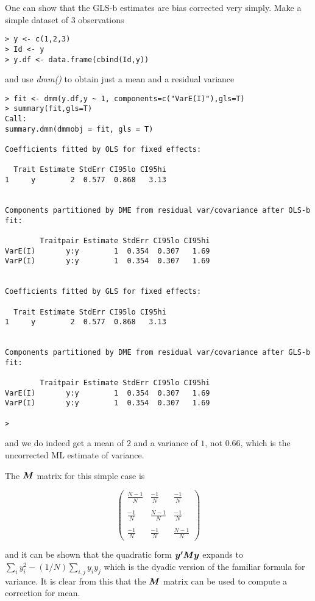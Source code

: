 \documentclass[titlepage]{article}  %
\begin{document}
One can show that the GLS-b estimates are bias corrected very simply. Make a simple dataset of 3 observations

\begin{verbatim}
> y <- c(1,2,3)
> Id <- y
> y.df <- data.frame(cbind(Id,y))
\end{verbatim}

and use {\em dmm()} to obtain just a mean and a residual variance

\begin{verbatim}
> fit <- dmm(y.df,y ~ 1, components=c("VarE(I)"),gls=T)
> summary(fit,gls=T)
Call:
summary.dmm(dmmobj = fit, gls = T)

Coefficients fitted by OLS for fixed effects:

  Trait Estimate StdErr CI95lo CI95hi
1     y        2  0.577  0.868   3.13


Components partitioned by DME from residual var/covariance after OLS-b fit:

        Traitpair Estimate StdErr CI95lo CI95hi
VarE(I)       y:y        1  0.354  0.307   1.69
VarP(I)       y:y        1  0.354  0.307   1.69


Coefficients fitted by GLS for fixed effects:

  Trait Estimate StdErr CI95lo CI95hi
1     y        2  0.577  0.868   3.13


Components partitioned by DME from residual var/covariance after GLS-b fit:

        Traitpair Estimate StdErr CI95lo CI95hi
VarE(I)       y:y        1  0.354  0.307   1.69
VarP(I)       y:y        1  0.354  0.307   1.69

> 
\end{verbatim}
 
and we do indeed get a mean of $2$ and a variance of $1$, not $0.66$, which is the uncorrected ML estimate of variance.

The $\mbox{\boldmath $M$}$ matrix for this simple case is 

\[ \left( \begin{array}{ccc}
 \frac{N-1}{N} & \frac{-1}{N}  & \frac{-1}{N} \\ \\
 \frac{-1}{N}  & \frac{N-1}{N} & \frac{-1}{N} \\ \\
 \frac{-1}{N}  & \frac{-1}{N}  & \frac{N-1}{N}
\end{array} \right) \]

and it can be shown that the quadratic form $\mbox{\boldmath $y^{\prime}My$}$ expands to $\sum_{i}y_{i}^{2} - (1/N)\sum_{i,j}y_{i}y_{j}$ which is the dyadic version of the familiar formula for variance. It is clear from this that the $\mbox{\boldmath $M$}$ matrix can be used to compute a correction for mean.
\end{document}
